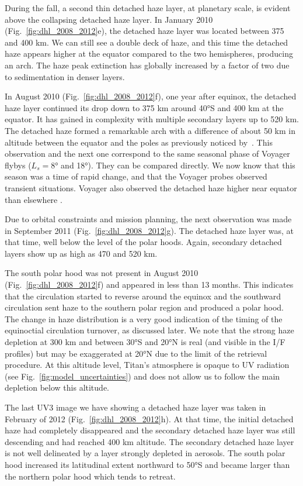 During the fall, a second thin detached haze layer, at planetary scale, is evident above the collapsing detached
haze layer. In January 2010 (Fig.~\ref{fig:dhl_2008_2012}e), the detached haze layer was located between 375 and 400 km.
We can still see a double deck of haze, and this time the detached haze appears higher at the equator compared to the two
hemispheres, producing an arch. The haze peak extinction has globally increased by a factor of two due to sedimentation
in denser layers.

In August 2010 (Fig.~\ref{fig:dhl_2008_2012}f), one year after equinox, the detached haze layer continued
its drop down to 375 km around \ang{40}S and 400 km at the equator. It has gained in complexity with
multiple secondary layers up to 520 km. The detached haze formed a remarkable arch with a difference of about 50 km
in altitude between the equator and the poles as previously noticed by~\cite{West2011}.
This observation and the next one correspond to the same seasonal phase  of Voyager flybys ($L_s=\ang{8}$ and \ang{18}).
They can be compared directly.
We now know that this season was a time of rapid change, and that the Voyager probes observed transient situations.
Voyager also observed the detached haze higher near equator than elsewhere \citep{Rages1983, Rannou2000}.

Due to orbital constraints and mission planning, the next observation was made in September 2011
(Fig.~\ref{fig:dhl_2008_2012}g). The detached haze layer was, at that time, well below the level of the polar hoods.
Again, secondary detached layers show up as high as 470 and 520 km.

The south polar hood was not present in August 2010 (Fig.~\ref{fig:dhl_2008_2012}f) and appeared in less than 13 months.
This indicates that the circulation started to reverse around the equinox and the southward circulation sent haze to
the southern polar region and produced a polar hood. The change in haze distribution
is a very good indication of the timing of the equinoctial circulation turnover, as  discussed later. We note
that the strong haze depletion at 300 km and between \ang{30}S and \ang{20}N is real (and visible in the I/F profiles) but may be exaggerated at \ang{20}N
due to the limit of the retrieval procedure. At this altitude level, Titan's atmosphere is opaque to UV radiation
(see Fig.~\ref{fig:model_uncertainties}) and does not allow us to follow the main depletion below this altitude.

The last UV3 image we have showing a detached haze layer was taken in February of 2012 (Fig.~\ref{fig:dhl_2008_2012}h). At that
time, the initial detached haze had completely disappeared and the secondary detached haze layer was still descending
and had reached 400 km altitude. The secondary detached haze layer is not well delineated by a layer strongly depleted in aerosols.
The south polar hood increased its latitudinal extent northward to \ang{50}S and became larger than the northern
polar hood which tends to retreat.
